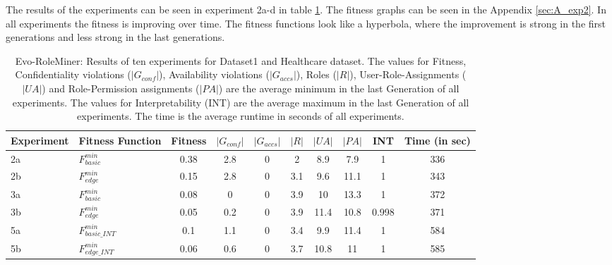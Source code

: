 The results of the experiments can be seen in experiment 2a-d in table \ref{tab:exp2_results}. The fitness graphs can be seen in the Appendix \ref{sec:A_exp2}. In all experiments the fitness is improving over time. The fitness functions look like a hyperbola, where the improvement is strong in the first generations and less strong in the last generations.

\begin{table}
   	\centering
   	\caption{Evo-RoleMiner: Results of ten experiments for Dataset1 and Healthcare dataset. The values for Fitness, Confidentiality violations ($|G_{conf}|$), Availability violations ($|G_{accs}|$), Roles ($|R|$), User-Role-Assignments ($|UA|$) and Role-Permission assignments ($|PA|$) are the average minimum in the last Generation of all experiments. The values for Interpretability (INT) are the average maximum in the last Generation of all experiments. The time is the average runtime in seconds of all experiments.}
   	\label{tab:exp2_results}
    \begin{adjustbox}{width=\textwidth}
	     \begin{tabular}{|l|l|c|c|c|c|c|c|c|c|}
	         \hline
	         \rowcolor{myGray} 
	         \textbf{Experiment} & \textbf{Fitness Function} & \textbf{Fitness} & \textbf{$|G_{conf}|$} & \textbf{$|G_{accs}|$} & \textbf{$|R|$} & \textbf{$|UA|$} & \textbf{$|PA|$} & \textbf{INT} & \textbf{Time (in sec)}\\ \hline
	         2a & $F_{basic}^{min}$ &   0.38   &   2.8   &   0   &   2   &   8.9   &   7.9   &  1   &   336\\ \hline
	         2b & $F_{edge}^{min}$ &    0.15    &   2.8   &   0   &   3.1   &   9.6   &   11.1   &   1   &   343\\ \hline            
	         3a & $F_{basic}^{min}$ &   0.08   &   0   &   0   &   3.9   &   10   &   13.3   &   1   & 372\\ \hline
	         3b & $F_{edge}^{min}$ &   0.05   &   0.2   &   0   &   3.9   &   11.4   &   10.8   &   0.998   & 371\\ \hline            
	         5a & $F_{basic\_INT}^{min}$ &   0.1  &   1.1   &   0   &   3.4   &   9.9   &   11.4   &   1   &   584\\ \hline
	         5b & $F_{edge\_INT}^{min}$ &   0.06   &   0.6   &   0   &   3.7   &   10.8   &   11   &   1   &   585\\ \hline
	     \end{tabular}
	\end{adjustbox}

\end{table}
